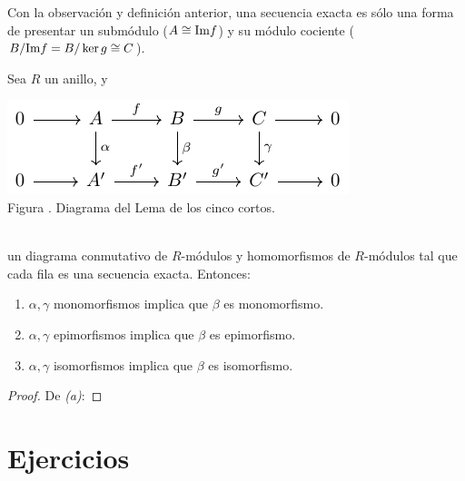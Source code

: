\documentclass[12pt]{report}
\newcounter{it}
\theoremstyle{largebreak}
\newcommand{\im}{\ensuremath{\textup{Im}}}
\begin{document}
    Con la observación y definición anterior, una secuencia exacta es sólo una forma de presentar un submódulo ($A\cong \im f$) y su módulo cociente ($B/\im f=B/\ker g\cong C$).

\setcounter{figcount}{1}

    \begin{lema}
        Sea $R$ un anillo, y
        
        \begin{minipage}{\textwidth}
            \begin{center}
                \includegraphics[scale=1.5]{images/fig_1.pdf}\\
                Figura \thefigcount. Diagrama del Lema de los cinco cortos.
            \end{center}
        \end{minipage}
        \\

        un diagrama conmutativo de $R$-módulos y homomorfismos de $R$-módulos tal que cada fila es una secuencia exacta. Entonces:
        \begin{enumerate}[label = \textit{(\alph*)}]
            \item $\alpha,\gamma$ monomorfismos implica que $\beta$ es monomorfismo.
            \item $\alpha,\gamma$ epimorfismos implica que $\beta$ es epimorfismo.
            \item $\alpha,\gamma$ isomorfismos implica que $\beta$ es isomorfismo.
        \end{enumerate}
    \end{lema}

    \begin{proof}
        De \textit{(a)}: 
    \end{proof}



    \newpage

    \section{Ejercicios}
\end{document}
